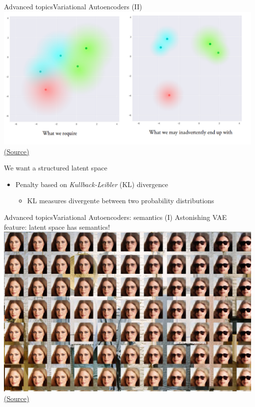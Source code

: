 \documentclass[10pt,compress]{beamer} %
\begin{document}
\begin{frame}{Advanced topics}{Variational Autoencoders (II)}
	\centering\includegraphics[width=0.6\linewidth]{figs/vae-kl.png}\\
	\scriptsize\href{https://towardsdatascience.com/intuitively-understanding-variational-autoencoders-1bfe67eb5daf}{(Source)}

	\smallskip

	\flushleft
	\normalsize

	We want a structured latent space
	\begin{itemize}
		\item Penalty based on \textit{Kullback-Leibler} (KL) divergence
			\begin{itemize}
				\item KL measures divergente between two probability distributions
			\end{itemize}
	\end{itemize}
\end{frame}

\begin{frame}{Advanced topics}{Variational Autoencoders: semantics (I)}
	Astonishing VAE feature: latent space has semantics!
	\centering\includegraphics[width=0.7\linewidth]{figs/faces.jpg}\\
	\scriptsize\href{https://www.compthree.com/blog/autoencoder/}{(Source)}
\end{frame}
\end{document}
